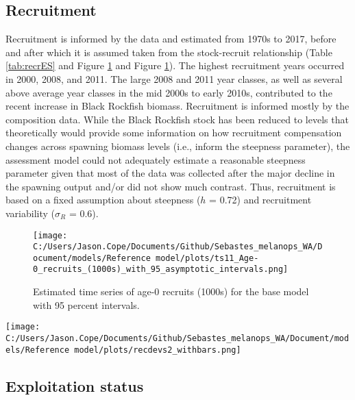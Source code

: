 \documentclass[11pt,
  english,
  letterpaper,
]{article}
\begin{document}
\clearpage

\hypertarget{recruitment}{%
\subsection*{Recruitment}\label{recruitment}}

Recruitment is informed by the data and estimated from 1970s to 2017, before and after which it is assumed taken from the stock-recruit relationship (Table \ref{tab:recrES} and Figure \ref{fig:es-recruits} and Figure \ref{fig:es-recruits}). The highest recruitment years occurred in 2000, 2008, and 2011. The large 2008 and 2011 year classes, as well as several above average year classes in the mid 2000s to early 2010s, contributed to the recent increase in Black Rockfish biomass. Recruitment is informed mostly by the composition data. While the Black Rockfish stock has been reduced to levels that theoretically would provide some information on how recruitment compensation changes across spawning biomass levels (i.e., inform the steepness parameter), the assessment model could not adequately estimate a reasonable steepness parameter given that most of the data was collected after the major decline in the spawning output and/or did not show much contrast. Thus, recruitment is based on a fixed assumption about steepness (\(h\) = 0.72) and recruitment variability (\(\sigma_R\) = 0.6).



\begin{figure}
\centering
\texttt{[image: C:/Users/Jason.Cope/Documents/Github/Sebastes\_melanops\_WA/Document/models/Reference model/plots/ts11\_Age-0\_recruits\_(1000s)\_with\_95\_asymptotic\_intervals.png]}
\caption{Estimated time series of age-0 recruits (1000s) for the base model with 95 percent intervals.\label{fig:es-recruits}}
\end{figure}

\texttt{[image: C:/Users/Jason.Cope/Documents/Github/Sebastes\_melanops\_WA/Document/models/Reference model/plots/recdevs2\_withbars.png]} \clearpage

\hypertarget{exploitation-status}{%
\subsection*{Exploitation status}\label{exploitation-status}}
\end{document}
